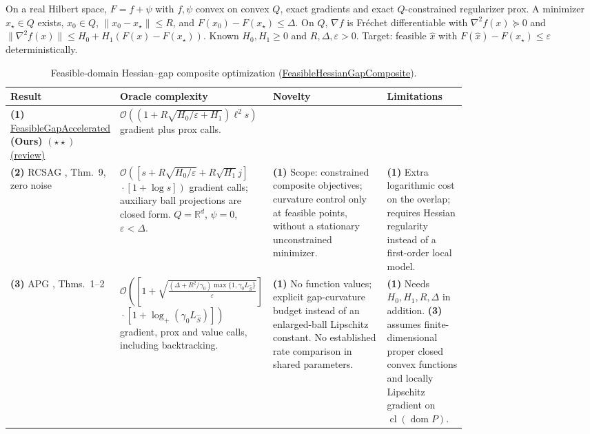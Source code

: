 \begin{table}[tp]
\centering
\caption{Feasible-domain Hessian--gap composite optimization (\href{https://github.com/k3nfalt/longtails/blob/main/LongTails/Setups/FeasibleHessianGapComposite.lean}{FeasibleHessianGapComposite}).}\label{tab:FeasibleHessianGapComposite}
\parbox{\linewidth}{\footnotesize On a real Hilbert space, $F=f+\psi$ with $f,\psi$ convex on convex $Q$, exact gradients and exact $Q$-constrained regularizer prox. A minimizer $x_\star\in Q$ exists, $x_0\in Q$, $\|x_0-x_\star\|\le R$, and $F(x_0)-F(x_\star)\le\Delta$. On $Q$, $\nabla f$ is Fr\'{e}chet differentiable with $\nabla^2f(x)\succeq0$ and $\|\nabla^2f(x)\|\le H_0+H_1(F(x)-F(x_\star))$. Known $H_0,H_1\ge0$ and $R,\Delta,\varepsilon>0$. Target: feasible $\widehat x$ with $F(\widehat x)-F(x_\star)\le\varepsilon$ deterministically.}\par\smallskip
\begin{threeparttable}
\footnotesize
\setlength{\tabcolsep}{4pt}\renewcommand{\arraystretch}{1.25}
\begin{tabularx}{\linewidth}{@{}>{\raggedright\arraybackslash}p{0.20\linewidth}>{\raggedright\arraybackslash}p{0.32\linewidth}>{\raggedright\arraybackslash}p{0.25\linewidth}>{\raggedright\arraybackslash}X@{}}
\toprule
\textbf{Result} & \textbf{Oracle complexity} & \textbf{Novelty} & \textbf{Limitations} \\
\midrule
\textbf{(1)} \href{https://github.com/k3nfalt/longtails/blob/main/LongTails/Theorems/FeasibleGapAccelerated.lean}{Feasible\allowbreak Gap\allowbreak Accelerated} \textbf{(Ours)} $(\star\star)$ \href{https://github.com/k3nfalt/longtails/blob/main/scripts/reviews/FeasibleGapAccelerated.md}{(review)} & $\mathcal{O}\!\left((1+R\sqrt{H_0/\varepsilon+H_1})\ell^2 s\right)$ gradient plus prox calls. & & \\
\midrule[1.2pt]
\textbf{(2)} RCSAG \citep{fhgLobanov2026}, Thm.~9, zero noise & $\mathcal{O}\!\left([s+R\sqrt{H_0/\varepsilon}+R\sqrt{H_1}j]\right.$\newline $\left.{}\cdot[1+\log s]\right)$ gradient calls; auxiliary ball projections are closed form. $Q=\mathbb R^d$, $\psi=0$, $\varepsilon<\Delta$. & \textbf{(1)} Scope: constrained composite objectives; curvature control only at feasible points, without a stationary unconstrained minimizer. & \textbf{(1)} Extra logarithmic cost on the overlap; requires Hessian regularity instead of a first-order local model. \\
\midrule
\textbf{(3)} APG \citep{fhgLuMei2023}, Thms.~1--2 & $\mathcal{O}\!\left(\left[1+\sqrt{\frac{(\Delta+R^2/\gamma_0)\max\{1,\gamma_0L_{\widehat S}\}}{\varepsilon}}\right]\right.$\newline $\left.{}\cdot[1+\log_+(\gamma_0L_{\widehat S})]\right)$ gradient, prox and value calls, including backtracking. & \textbf{(1)} No function values; explicit gap-curvature budget instead of an enlarged-ball Lipschitz constant. No established rate comparison in shared parameters. & \textbf{(1)} Needs $H_0,H_1,R,\Delta$ in addition. \textbf{(3)} assumes finite-dimensional proper closed convex functions and locally Lipschitz gradient on $\operatorname{cl}(\operatorname{dom}P)$. \\

\end{tabularx}
\end{threeparttable}
\end{table}
